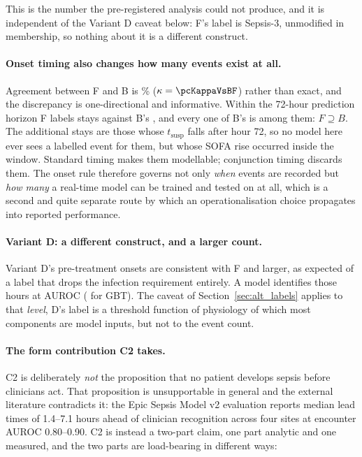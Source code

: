 This is the number the pre-registered analysis could not produce, and it is
independent of the Variant D caveat below: F's label is Sepsis-3, unmodified in
membership, so nothing about it is a different construct.

\paragraph{Onset timing also changes how many events exist at all.}
Agreement between F and B is \pcPctAgreeBF\% ($\kappa = \pcKappaVsBF$) rather
than exact, and the discrepancy is one-directional and informative. Within the
72-hour prediction horizon F labels \pcNPositiveF{} stays against B's
\pcNPositiveB, and every one of B's is among them: $F \supseteq B$. The
\pcFNExtraInHorizon{} additional stays are those whose $t_{\text{susp}}$ falls
after hour 72, so no model here ever sees a labelled event for them, but
whose SOFA rise occurred inside the window. Standard timing makes them
modellable; conjunction timing discards them. The onset rule therefore governs
not only \emph{when} events are recorded but \emph{how many} a real-time model
can be trained and tested on at all, which is a second and quite separate route
by which an operationalisation choice propagates into reported performance.

\paragraph{Variant D: a different construct, and a larger count.}
Variant D's \pcPreTreatOnsetsVarD{} pre-treatment onsets are consistent with F
and larger, as expected of a label that drops the infection requirement
entirely. A model identifies those hours at \pcPreTreatAurocPrimaryD{} AUROC
(\pcPreTreatAurocGbtD{} for GBT). The caveat of Section~\ref{sec:alt_labels}
applies to that \emph{level}, D's label is a threshold function of
physiology of which most components are model inputs, but not to the event
count.

\paragraph{The form contribution C2 takes.}
C2 is deliberately \emph{not} the proposition that no patient develops sepsis
before clinicians act. That proposition is unsupportable in general and the
external literature contradicts it: the Epic Sepsis Model v2 evaluation
\cite{wong2026epic} reports median lead times of 1.4--7.1 hours ahead of
clinician recognition across four sites at encounter AUROC 0.80--0.90. C2 is
instead a two-part claim, one part analytic and one measured, and the two parts
are load-bearing in different ways:

